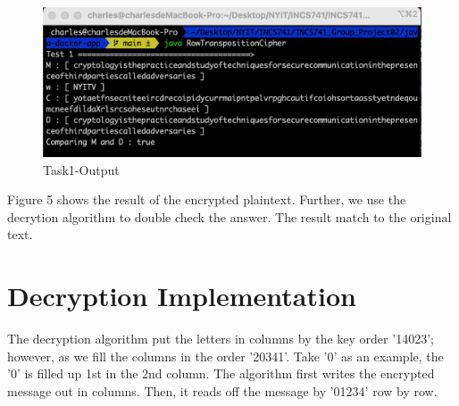 \documentclass[twoside,twocolumn]{article}
\begin{document}
\begin{figure}[H]
  \centering
  \includegraphics[scale=0.35]{./Graphs/Figure1.6.png}
  \caption{Task1-Output}
  \label{fig:testfig1}
\end{figure}

Figure 5 shows the result of the encrypted plaintext. Further, we use the decrytion algorithm to double check the answer. The result match to the original text.\\ 

\vspace*{-0.10cm}
\section{Decryption Implementation}

The decryption algorithm put the letters in columns by the key order '14023'; however, as we fill the columns in the order '20341'. Take '0' as an example, the '0' is filled up 1st in the 2nd column. The algorithm first writes the encrypted message out in columns. Then, it reads off the message by '01234' row by row. \\
\end{document}
